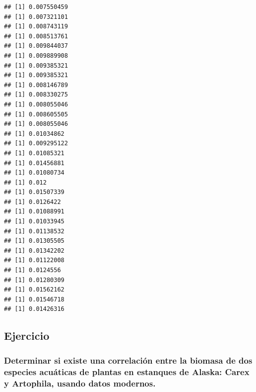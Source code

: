 \documentclass[
]{article}
\newenvironment{Shaded}{\begin{snugshade}}{\end{snugshade}}
\newcommand{\CommentTok}[1]{\textcolor[rgb]{0.56,0.35,0.01}{\textit{#1}}}
\newcommand{\FunctionTok}[1]{\textcolor[rgb]{0.13,0.29,0.53}{\textbf{#1}}}
\newcommand{\NormalTok}[1]{#1}
\newcommand{\OtherTok}[1]{\textcolor[rgb]{0.56,0.35,0.01}{#1}}
\newcommand{\SpecialCharTok}[1]{\textcolor[rgb]{0.81,0.36,0.00}{\textbf{#1}}}
\newcommand{\StringTok}[1]{\textcolor[rgb]{0.31,0.60,0.02}{#1}}
\begin{document}
\begin{verbatim}
## [1] 0.007550459
## [1] 0.007321101
## [1] 0.008743119
## [1] 0.008513761
## [1] 0.009844037
## [1] 0.009889908
## [1] 0.009385321
## [1] 0.009385321
## [1] 0.008146789
## [1] 0.008330275
## [1] 0.008055046
## [1] 0.008605505
## [1] 0.008055046
## [1] 0.01034862
## [1] 0.009295122
## [1] 0.01085321
## [1] 0.01456881
## [1] 0.01080734
## [1] 0.012
## [1] 0.01507339
## [1] 0.0126422
## [1] 0.01088991
## [1] 0.01033945
## [1] 0.01138532
## [1] 0.01305505
## [1] 0.01342202
## [1] 0.01122008
## [1] 0.0124556
## [1] 0.01280309
## [1] 0.01562162
## [1] 0.01546718
## [1] 0.01426316
\end{verbatim}

\hypertarget{ejercicio}{%
\subsection{Ejercicio}\label{ejercicio}}

\hypertarget{determinar-si-existe-una-correlaciuxf3n-entre-la-biomasa-de-dos-especies-acuuxe1ticas-de-plantas-en-estanques-de-alaska-carex-y-artophila-usando-datos-modernos.}{%
\subsubsection{Determinar si existe una correlación entre la biomasa de
dos especies acuáticas de plantas en estanques de Alaska: Carex y
Artophila, usando datos
modernos.}\label{determinar-si-existe-una-correlaciuxf3n-entre-la-biomasa-de-dos-especies-acuuxe1ticas-de-plantas-en-estanques-de-alaska-carex-y-artophila-usando-datos-modernos.}}

\begin{Shaded}
\end{Shaded}
\end{document}
